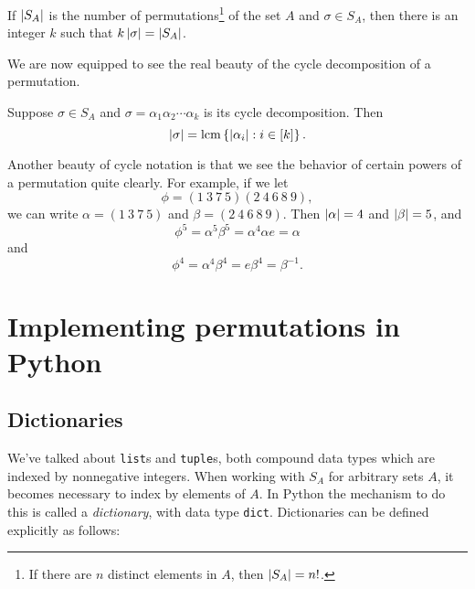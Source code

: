 \documentclass[m3380-lec-main.tex]{subfiles}
\begin{document}
\begin{thm} If $\left|S_A\right|$ is the number of permutations\footnote{If there are $n$ distinct elements in $A$, then $\left|S_A\right|=n!$.} of the set $A$ and $\sigma\in S_A$, then there is an integer $k$ such that $k\left|\sigma\right|=\left|S_A\right|$.
\end{thm}

We are now equipped to see the real beauty of the cycle decomposition of a permutation.

\begin{thm} Suppose $\sigma\in S_A$ and $\sigma=\alpha_1\alpha_2\cdots\alpha_k$ is its cycle decomposition. Then \[\left|\sigma\right|=\operatorname{lcm}\left\{\left|\alpha_i\right|:i\in[k]\right\}.\]
\end{thm}

\begin{exmp}Another beauty of cycle notation is that we see the behavior of certain powers of a permutation quite clearly. For example, if we let 
\[\phi=(1~3~7~5)(2~4~6~8~9),\]
we can write $\alpha=(1~3~7~5)$ and $\beta=(2~4~6~8~9)$. Then $\left|\alpha\right|=4$ and $\left|\beta\right|=5$, and
\[\phi^5 = \alpha^5\beta^5 = \alpha^4\alpha e=\alpha \]
and
\[\phi^4 = \alpha^4\beta^4 = e\beta^{4} = \beta^{-1}.\]
\end{exmp}

\section{Implementing permutations in Python}
\subsection{Dictionaries}
We've talked about \verb|list|s and \verb|tuple|s, both compound data types which are indexed by nonnegative integers. When working with $S_A$ for arbitrary sets $A$, it becomes necessary to index by elements of $A$. In Python the mechanism to do this is called a \emph{dictionary}, with data type \verb|dict|. Dictionaries can be defined explicitly as follows:

\smallskip\noindent
\end{document}
